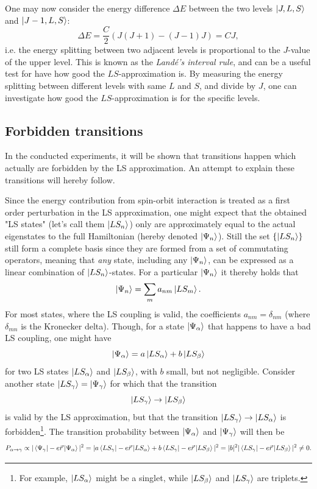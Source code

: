 \documentclass[a4paper]{article}
\begin{document}
One may now consider the energy difference $\Delta E$ between the two levels $\Ket{J,L,S}$ and $\Ket{J-1,L,S}$:
\begin{equation}
\Delta E = \frac{C}{2} ( J(J+1) - (J-1)J ) = C J,
\end{equation} 
i.e. the energy splitting between two adjacent levels is proportional to the $J$-value of the upper level. This is known as the \textit{Land\'e's interval rule}, and can be a useful test for have how good the $LS$-approximation is. By measuring the energy splitting between different levels with same $L$ and $S$, and divide by $J$, one can investigate how good the $LS$-approximation is for the specific levels. 

\subsection{Forbidden transitions}

In the conducted experiments, it will be shown that transitions happen which actually are forbidden by the LS approximation. An attempt to explain these transitions will hereby follow. 

Since the energy contribution from spin-orbit interaction is treated as a first order perturbation in the LS approximation, one might expect that the obtained "LS states" (let's call them $\left| LS_n \right>$) only are approximately equal to the actual eigenstates to the full Hamiltonian (hereby denoted $\left| \Psi_n \right>$). Still the set $\{ \left| LS_n \right> \}$ still form a complete basis since they are formed from a set of commutating operators, meaning that \textit{any} state, including any $\left| \Psi_n \right>$, can be expressed as a linear combination of $\left| LS_n \right>$-states. For a particular $\left| \Psi_n \right>$ it thereby holds that
\begin{equation}
\left| \Psi_n \right> = \sum_m a_{nm} \left| LS_m \right>.
\end{equation}
For most states, where the LS coupling is valid, the coefficients $a_{nm} = \delta_{nm}$ (where $\delta_{mn}$ is the Kronecker delta). Though, for a state $\left| \Psi_\alpha \right>$ that happens to have a bad LS coupling, one might have
\begin{equation}
\left| \Psi_\alpha \right> = a \left| LS_\alpha \right> + b \left| LS_\beta \right>
\end{equation}
for two LS states $\left| LS_\alpha \right>$ and $\left| LS_\beta \right>$, with $b$ small, but not negligible. Consider another state $\left| LS_\gamma \right> = \left| \Psi_\gamma \right>$ for which that the transition
\begin{equation}
\left| LS_\gamma \right> \to \left| LS_\beta \right>
\end{equation}
is valid by the LS approximation, but that the transition $\left| LS_\gamma \right> \to \left| LS_\alpha \right>$ is forbidden\footnote{For example, $\left| LS_\alpha \right>$ might be a singlet, while $\left| LS_\beta \right>$ and $\left| LS_\gamma \right>$ are triplets.}. The transition probability between $\left| \Psi_\alpha \right>$ and $\left| \Psi_\gamma \right>$ will then be
\begin{equation}
P_{\alpha \to \gamma} \propto |\left< \Psi_\gamma \right|-e\vec{r}\left| \Psi_\alpha \right>|^2 = |a\left< LS_\gamma \right|-e\vec{r}\left| LS_\alpha \right> + b\left< LS_\gamma \right|-e\vec{r}\left| LS_\beta \right>|^2 = |b|^2 |\left< LS_\gamma \right|-e\vec{r}\left| LS_\beta \right>|^2 \neq 0.
\end{equation}
\end{document}
